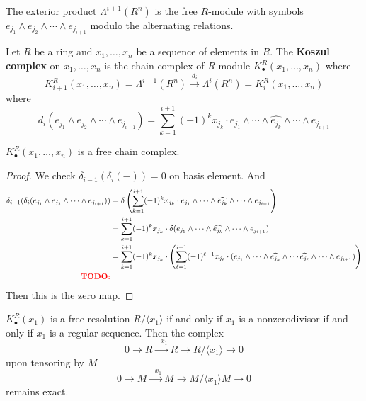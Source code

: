 \documentclass[12pt]{amsart}
\begin{document}
\begin{definition}
    The exterior product $\Lambda ^{i+1}(R^n)$ is the free $R$-module with symbols $e_{j_1} \wedge e_{j_2} \wedge \cdots \wedge e_{j_{i+1}}$ modulo the alternating relations. 
\end{definition}

\begin{definition}
    Let $R$ be a ring and $x_1, \ldots, x_n$ be a sequence of elements in $R$. The \textbf{Koszul complex} on $x_1, \ldots, x_n$ is the chain complex of $R$-module $K^R_\bullet(x_1, \ldots, x_n)$ where 
    \[K^R_{i+1}(x_1, \ldots, x_n) = \Lambda ^{i+1}(R^n) \xrightarrow{d_i} \Lambda ^{i}(R^n) = K^R_{i} (x_1, \ldots, x_n)\] where 
    \[d_i(e_{j_1} \wedge e_{j_2} \wedge \cdots \wedge e_{j_{i+1}}) = \sum_{k=1}^{i+1} (-1)^k x_{j_k} \cdot e_{j_1} \wedge \cdots \wedge \widehat{e_{j_k}} \wedge \cdots \wedge e_{j_{i+1}}\]
\end{definition}

\begin{proposition}
    $K^R_\bullet(x_1, \ldots, x_n)$ is a free chain complex. 
\end{proposition}

\begin{proof}
    We check $\delta_{i-1}(\delta_i(-)) = 0$ on basis element. And 
    \begin{align*}
        \delta_{i-1}(\delta_i(e_{j_1} \wedge e_{j_2} \wedge \cdots \wedge e_{j_{i+1}})) &= \delta\left(\sum_{k=1}^{i+1} (-1)^k x_{j_k} \cdot e_{j_1} \wedge \cdots \wedge \widehat{e_{j_k}} \wedge \cdots \wedge e_{j_{i+1}}\right) \\ 
        &= \sum_{k=1}^{i+1} (-1)^k x_{j_k} \cdot \delta (e_{j_1} \wedge \cdots \wedge \widehat{e_{j_k}} \wedge \cdots \wedge e_{j_{i+1}}) \\ 
        &= \sum_{k=1}^{i+1} (-1)^k x_{j_k} \cdot \left(\sum_{\ell=1}^{i+1} (-1)^{\ell-1} x_{j_\ell} \cdot (e_{j_1} \wedge \cdots \wedge \widehat{e_{j_k}} \wedge \cdots \widehat{e_{j_\ell}} \wedge \cdots \wedge e_{j_{i+1}})\right) \\ 
        \textcolor{red}{\textbf{TODO:} }
    \end{align*}
    Then this is the zero map. 
\end{proof}

\begin{lemma}
    $K^R_\bullet(x_1)$ is a free resolution $R/\langle x_1 \rangle$ if and only if $x_1$ is a nonzerodivisor if and only if $x_1$ is a regular sequence. Then the complex 
    \[ 0 \to R \xrightarrow{-x_1} R \to R/\langle x_1 \rangle \to 0\] 
    upon tensoring by $M$
    \[ 0 \to M \xrightarrow{-x_1} M \to M/\langle x_1 \rangle M \to 0\] 
    remains exact. 
\end{lemma}
\end{document}
